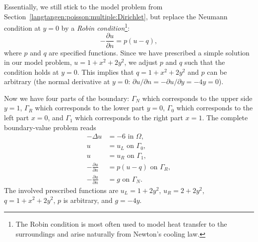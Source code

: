 Essentially, we still stick to the model problem from
Section~\ref{langtangen:poisson:multiple:Dirichlet}, but replace the
Neumann condition at $y=0$ by a \emph{Robin condition}\footnote{The Robin
condition is most often used to model heat transfer to the surroundings
and arise naturally from Newton's cooling law.}:
\begin{equation}
 - \frac{\partial u}{\partial n} = p(u-q),
\end{equation}
where $p$ and $q$ are specified functions.  Since we have prescribed
a simple solution in our model problem, $u=1+x^2+2y^2$, we adjust
$p$ and $q$ such that the condition holds at $y=0$. This implies that
$q=1+x^2+2y^2$ and $p$ can be arbitrary (the normal derivative at $y=0$:
$\partial u/\partial n = -\partial u/\partial y = -4y=0$).

Now we have four parts of the boundary: $\Gamma_N$ which corresponds
to the upper side $y=1$, $\Gamma_R$ which corresponds to the lower part
$y=0$, $\Gamma_0$ which corresponds to the left part $x=0$, and $\Gamma_1$
which corresponds to the right part $x=1$. The complete boundary-value
problem reads
\begin{align}
  - \Delta u &= -6 \mbox{ in } \Omega,
  \label{langtangen:poisson:2D:DN3}
\\
  u &= u_L \mbox{ on } \Gamma_0,
  \label{langtangen:poisson:2D:DN3:bc1}
\\
  u &= u_R \mbox{ on } \Gamma_1,
  \label{langtangen:poisson:2D:DN3:bc2}
\\
  - \frac{\partial u}{\partial n} &= p(u-q) \mbox{ on } \Gamma_R,
  \label{langtangen:poisson:2D:DN3:bc3}
\\
  - \frac{\partial u}{\partial n} &= g \mbox{ on } \Gamma_N.
  \label{langtangen:poisson:2D:DN3:bc4}
\end{align}
The involved prescribed functions are $u_L= 1 + 2y^2$, $u_R = 2 + 2y^2$,
$q=1+x^2+2y^2$, $p$ is arbitrary, and $g=-4y$.

